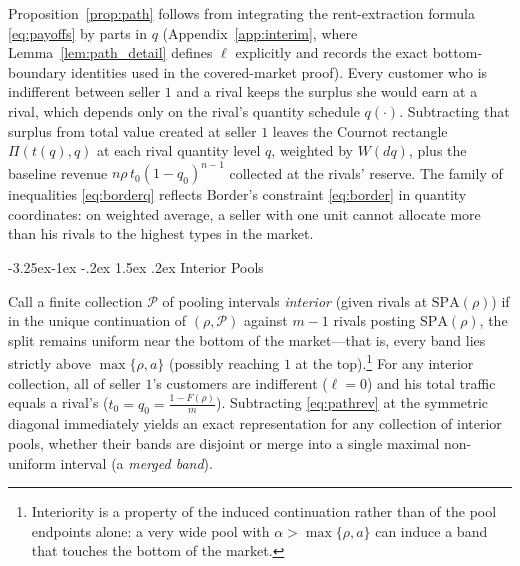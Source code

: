 \documentclass[12pt]{article}
\makeatletter
\theoremstyle{mystyle}
\theoremstyle{mystyle2}
\newcommand{\mmpfont}{\scshape}
\renewcommand\subsection{\@startsection{subsection}{2}{\z@}%
                                     {-3.25ex\@plus -1ex \@minus -.2ex}%
                                     {1.5ex \@plus .2ex}%
                                     {\normalfont\normalsize\mmpfont}}
\newcommand{\cP}{\mathcal{P}}
\newcommand{\SPA}{\mathrm{SPA}}
\newcommand{\1}{\mathbf{1}}
\makeatother
\begin{document}
Proposition~\ref{prop:path} follows from integrating the rent-extraction formula \eqref{eq:payoffs} by parts in $q$ (Appendix~\ref{app:interim}, where Lemma~\ref{lem:path_detail} defines $\ell$ explicitly and records the exact bottom-boundary identities used in the covered-market proof). Every customer who is indifferent between seller $1$ and a rival keeps the surplus she would earn at a rival, which depends only on the rival's quantity schedule $q(\cdot)$. Subtracting that surplus from total value created at seller $1$ leaves the Cournot rectangle $\Pi(t(q),q)$ at each rival quantity level $q$, weighted by $W(dq)$, plus the baseline revenue $n\rho\,t_0(1-q_0)^{n-1}$ collected at the rivals' reserve. The family of inequalities \eqref{eq:borderq} reflects Border's constraint \eqref{eq:border} in quantity coordinates: on weighted average, a seller with one unit cannot allocate more than his rivals to the highest types in the market.

\subsection{Interior Pools}

Call a finite collection $\cP$ of pooling intervals \emph{interior} (given rivals at $\SPA(\rho)$) if in the unique continuation of $(\rho,\cP)$ against $m-1$ rivals posting $\SPA(\rho)$, the split remains uniform near the bottom of the market---that is, every band lies strictly above $\max\{\rho,a\}$ (possibly reaching $1$ at the top).\footnote{Interiority is a property of the induced continuation rather than of the pool endpoints alone: a very wide pool with $\alpha>\max\{\rho,a\}$ can induce a band that touches the bottom of the market.} For any interior collection, all of seller $1$'s customers are indifferent ($\ell=0$) and his total traffic equals a rival's ($t_0=q_0=\frac{1-F(\rho)}{m}$). Subtracting \eqref{eq:pathrev} at the symmetric diagonal immediately yields an exact representation for any collection of interior pools, whether their bands are disjoint or merge into a single maximal non-uniform interval (a \emph{merged band}).
\end{document}
